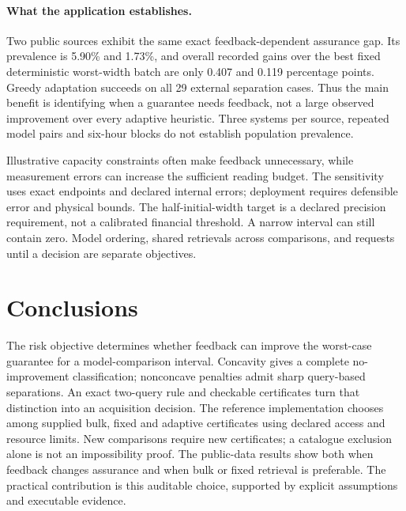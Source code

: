 \documentclass[12pt]{article}
\begin{document}
\paragraph{What the application establishes.}
Two public sources exhibit the same exact feedback-dependent assurance gap.
Its prevalence is 5.90\% and 1.73\%, and overall recorded gains over the best
fixed deterministic worst-width batch are only 0.407 and 0.119 percentage
points. Greedy adaptation succeeds on all 29 external separation cases.
Thus the main benefit is identifying when a guarantee needs feedback, not
a large observed improvement over every adaptive heuristic. Three systems
per source, repeated model pairs and six-hour blocks do not establish
population prevalence.

Illustrative capacity constraints often make feedback unnecessary, while
measurement errors can increase the sufficient reading budget. The
sensitivity uses exact endpoints and declared internal errors; deployment
requires defensible error and physical bounds. The half-initial-width target
is a declared precision requirement, not a calibrated financial threshold.
A narrow interval can still contain zero. Model ordering, shared retrievals
across comparisons, and requests until a decision are separate objectives.

\section{Conclusions}
The risk objective determines whether feedback can improve the worst-case
guarantee for a model-comparison interval. Concavity gives a complete
no-improvement classification; nonconcave penalties admit sharp query-based
separations. An exact two-query rule and checkable certificates turn that
distinction into an acquisition decision. The reference implementation chooses among supplied bulk, fixed and adaptive
certificates using declared access and resource limits. New comparisons require
new certificates; a catalogue exclusion alone is not an impossibility proof.
The public-data results show both when feedback changes assurance and when
bulk or fixed retrieval is preferable. The practical contribution is this
auditable choice, supported by explicit assumptions and executable evidence.
\end{document}
